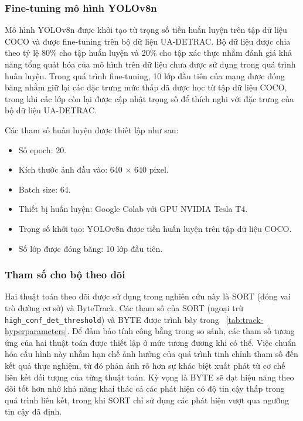 \subsubsection{Fine-tuning mô hình YOLOv8n}

Mô hình YOLOv8n được khởi tạo từ trọng số tiền huấn luyện trên tập dữ liệu
COCO và được fine-tuning trên bộ dữ liệu UA-DETRAC. Bộ dữ liệu được chia theo
tỷ lệ 80\% cho tập huấn luyện và 20\% cho tập xác thực nhằm đánh giá khả năng
tổng quát hóa của mô hình trên dữ liệu chưa được sử dụng trong quá trình huấn
luyện. Trong quá trình fine-tuning, 10 lớp đầu tiên của mạng được đóng băng
nhằm giữ lại các đặc trưng mức thấp đã được học từ tập dữ liệu COCO, trong khi
các lớp còn lại được cập nhật trọng số để thích nghi với đặc trưng của bộ dữ
liệu UA-DETRAC.

Các tham số huấn luyện được thiết lập như sau:
\begin{itemize}
  \item Số epoch: 20.
  \item Kích thước ảnh đầu vào: 640 $\times$ 640 pixel.
  \item Batch size: 64.
  \item Thiết bị huấn luyện: Google Colab với GPU NVIDIA Tesla T4.
  \item Trọng số khởi tạo: YOLOv8n được tiền huấn luyện trên tập dữ liệu COCO.
  \item Số lớp được đóng băng: 10 lớp đầu tiên.
\end{itemize}

\subsubsection{Tham số cho bộ theo dõi}

Hai thuật toán theo dõi được sử dụng trong nghiên cứu này là SORT (đóng vai trò
đường cơ sở) và ByteTrack. Các tham số của SORT (ngoại trừ
\texttt{high\_conf\_det\_threshold}) và BYTE được trình bày trong
\tablename~\ref{tab:track-hyperparameters}. Để đảm bảo tính công bằng trong so
sánh, các tham số tương ứng của hai thuật toán được thiết lập ở mức tương đương
khi có thể. Việc chuẩn hóa cấu hình này nhằm hạn chế ảnh hưởng của quá trình
tinh chỉnh tham số đến kết quả thực nghiệm, từ đó phản ánh rõ hơn sự khác biệt
xuất phát từ cơ chế liên kết đối tượng của từng thuật toán. Kỳ vọng là
BYTE sẽ đạt hiệu năng theo dõi tốt hơn nhờ khả năng khai thác cả các phát
hiện có độ tin cậy thấp trong quá trình liên kết, trong khi SORT chỉ sử dụng
các phát hiện vượt qua ngưỡng tin cậy đã định.

